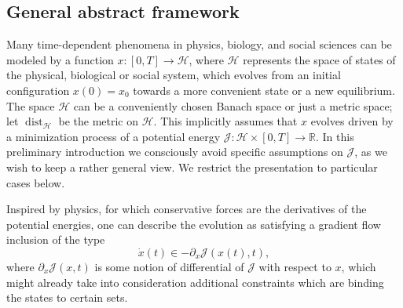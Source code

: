 
\subsection{General abstract framework}

Many time-dependent phenomena in physics, biology, and social sciences can be modeled by a function $x:[0,T] \to \mathcal H$, where $\mathcal H$ represents the space of states of the physical, biological or social system, which evolves from an initial configuration $x(0)=x_0$  towards a more convenient state or a new equilibrium. The space $\mathcal H$ can be a conveniently chosen Banach space or just a metric space; let $\operatorname{dist}_{\mathcal H}$ be the metric on $\mathcal H$.
This implicitly assumes that $x$ evolves driven by a minimization process of a potential energy $\mathcal J: \mathcal H \times [0,T] \to \mathbb R$.  In this preliminary introduction we consciously avoid specific assumptions on  $\mathcal J$, as we wish to keep a rather general view. We restrict the presentation to particular cases below.%

Inspired by physics, for which conservative forces are the derivatives of the potential energies, one can describe the evolution as satisfying a gradient flow inclusion of the type
\begin{equation}\label{gradientflow}
\dot x(t) \in - \partial_x \mathcal J(x(t),t),
\end{equation}
where $\partial_x \mathcal J(x,t)$ is some notion of differential of $\mathcal J$ with respect to $x$, which might already take into consideration additional constraints which are binding the states to certain sets.



